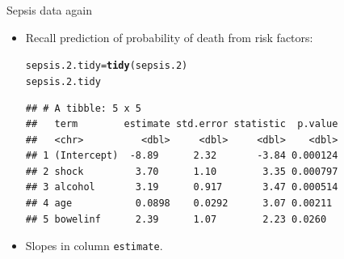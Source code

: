 \documentclass[unknownkeysallowed]{beamer}\usepackage[]{graphicx}\usepackage[]{color}
\makeatletter
\newcommand{\hlstd}[1]{\textcolor[rgb]{0.345,0.345,0.345}{#1}}%
\newcommand{\hlkwb}[1]{\textcolor[rgb]{0.69,0.353,0.396}{#1}}%
\newcommand{\hlkwd}[1]{\textcolor[rgb]{0.737,0.353,0.396}{\textbf{#1}}}%
\newenvironment{kframe}{%
 \def\at@end@of@kframe{}%
 \ifinner\ifhmode%
  \def\at@end@of@kframe{\end{minipage}}%
  \begin{minipage}{\columnwidth}%
 \fi\fi%
 \def\FrameCommand##1{\hskip\@totalleftmargin \hskip-\fboxsep
 \colorbox{shadecolor}{##1}\hskip-\fboxsep
     \hskip-\linewidth \hskip-\@totalleftmargin \hskip\columnwidth}%
 \MakeFramed {\advance\hsize-\width
   \@totalleftmargin\z@ \linewidth\hsize
   \@setminipage}}%
 {\par\unskip\endMakeFramed%
 \at@end@of@kframe}
\newenvironment{knitrout}{}{} %
\makeatother
\begin{document}
\begin{frame}[fragile]{Sepsis data again}
  
  \begin{itemize}
  \item Recall prediction of probability of death from risk factors:
    
\begin{knitrout}\small
{}\color{fgcolor}\begin{kframe}
\begin{alltt}
\hlstd{sepsis.2.tidy}\hlkwb{=}\hlkwd{tidy}\hlstd{(sepsis.2)}
\hlstd{sepsis.2.tidy}
\end{alltt}
\begin{verbatim}
## # A tibble: 5 x 5
##   term        estimate std.error statistic  p.value
##   <chr>          <dbl>     <dbl>     <dbl>    <dbl>
## 1 (Intercept)  -8.89      2.32       -3.84 0.000124
## 2 shock         3.70      1.10        3.35 0.000797
## 3 alcohol       3.19      0.917       3.47 0.000514
## 4 age           0.0898    0.0292      3.07 0.00211 
## 5 bowelinf      2.39      1.07        2.23 0.0260
\end{verbatim}
\end{kframe}
\end{knitrout}

\item Slopes in column \texttt{estimate}.
  \end{itemize}
  
\end{frame}
\end{document}

